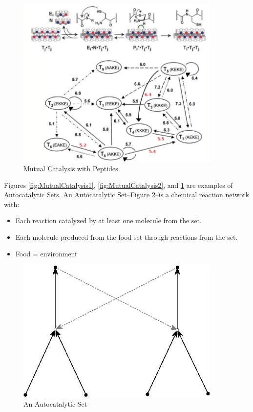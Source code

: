 \documentclass[]{article}
\begin{document}
\begin{figure}[H]
	\caption{Mutual Catalysis with Peptides}\label{fig:MutualCatalysis3}
	\includegraphics[width=0.9\textwidth]{MutualCatalysis3}
\end{figure}

Figures \ref{fig:MutualCatalysis1}, \ref{fig:MutualCatalysis2}, and \ref{fig:MutualCatalysis3} are examples of Autocatalytic Sets. An Autocatalytic Set--Figure \ref{fig:AutoCatalytic1}--is a chemical reaction network with:
\begin{itemize}
	\item Each reaction catalyzed by at least one molecule from the set.
	\item Each molecule produced from the food set through reactions from the set.
	\item Food = environment
\end{itemize}

\begin{figure}[H]
	\caption{An Autocatalytic Set}\label{fig:AutoCatalytic1}
	\includegraphics[width=0.9\textwidth]{AutoCatalytic1}
\end{figure}
\end{document}
